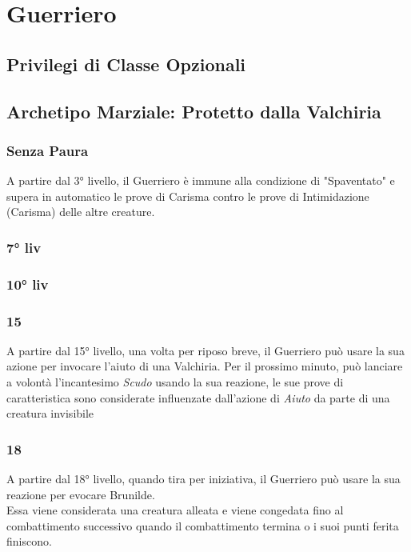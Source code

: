 \chapter{Guerriero}

\section{Privilegi di Classe Opzionali}

\section{Archetipo Marziale: Protetto dalla Valchiria}

\subsection{Senza Paura}
A partire dal 3° livello, il Guerriero è immune alla condizione di "Spaventato" e supera in automatico le prove di Carisma contro le prove di Intimidazione (Carisma) delle altre creature.

\subsection{7° liv}

\subsection{10° liv}

\subsection{15}
A partire dal 15° livello, una volta per riposo breve, il Guerriero può usare la sua azione per invocare l'aiuto di una Valchiria.
Per il prossimo minuto, può lanciare a volontà l'incantesimo \textit{Scudo} usando la sua reazione, le sue prove di caratteristica sono considerate influenzate dall'azione di \textit{Aiuto} da parte di una creatura invisibile

\subsection{18}
A partire dal 18° livello, quando tira per iniziativa, il Guerriero può usare la sua reazione per evocare Brunilde. \\ Essa viene considerata una creatura alleata e viene congedata fino al combattimento successivo quando il combattimento termina o i suoi punti ferita finiscono.